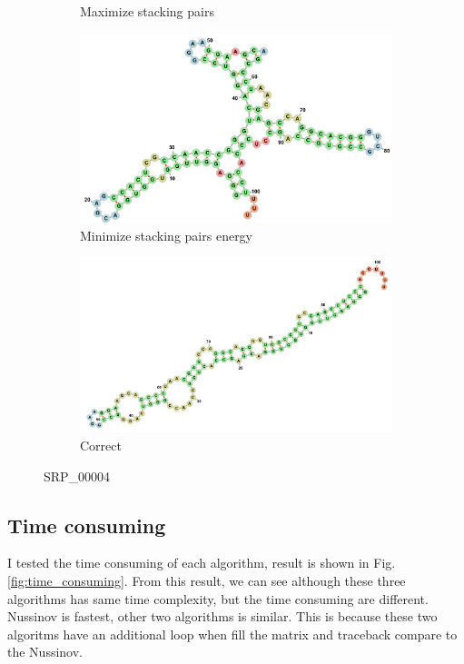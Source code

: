 \documentclass[10pt]{article}
\begin{document}
\begin{figure}[p]
\begin{subfigure}[b]{0.4\linewidth}
        \caption{Maximize stacking pairs}
    \end{subfigure}
    \begin{subfigure}[b]{0.4\linewidth}
        \includegraphics[width=\linewidth]{./img/SRP_00004_minstackenergy.png}
        \caption{Minimize stacking pairs energy}
    \end{subfigure}
    \begin{center}
        \begin{subfigure}[b]{\linewidth}
            \includegraphics[width=\linewidth]{./img/SRP_00004_correct.png}
            \caption{Correct}
        \end{subfigure}
    \end{center}
\caption{SRP\_00004}
\label{fig:SRP_00004}
\end{figure}

\pagebreak

\subsection{Time consuming}
I tested the time consuming of each algorithm, result is shown in Fig.\ref{fig:time_consuming}.
From this result, we can see although these three algorithms has same time complexity, but the time consuming are
different. Nussinov is fastest, other two algorithms is similar.
This is because these two algoritms have an additional loop when fill the matrix and traceback compare to the Nussinov.
\end{document}
